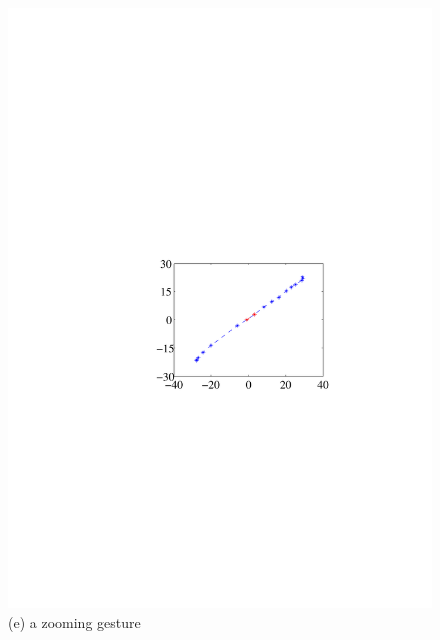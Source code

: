 \begin{figure}[!t]
{\begin{minipage}[t]{0.19\textwidth}
            \includegraphics[width=\textwidth]{fig/gesture-distinction5.pdf}\\
            \centering \footnotesize (e) a zooming gesture
            \end{minipage}
        }
        \hspace{0.25cm}
\end{figure}
